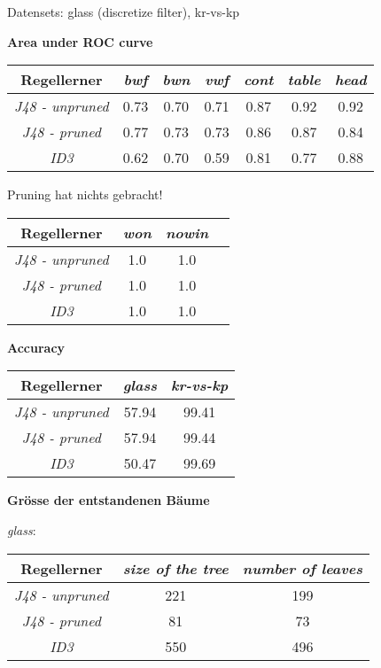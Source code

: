 
Datensets: glass (discretize filter), kr-vs-kp

\textbf{Area under ROC curve}

\begin{tabular}{c|c|c|c|c|c|c}
				Regellerner       & \emph{bwf} & \emph{bwn} & \emph{vwf}  & \emph{cont} & \emph{table} & \emph{head} \\ \hline
				\emph{J48 - unpruned}& 0.73 & 0.70 & 0.71 & 0.87 & 0.92 & 0.92 \\ \hline
				\emph{J48 - pruned}  & 0.77 & 0.73 & 0.73 & 0.86 & 0.87 & 0.84 \\ \hline
				\emph{ID3}           & 0.62 & 0.70 & 0.59 & 0.81 & 0.77 & 0.88 \\ \hline
\end{tabular}

Pruning hat nichts gebracht!

\begin{tabular}{c|c|c|c}
				Regellerner       & \emph{won} & \emph{nowin} \\ \hline
				\emph{J48 - unpruned} & 1.0 & 1.0  \\ \hline
				\emph{J48 - pruned}  & 1.0 & 1.0  \\ \hline
				\emph{ID3}  & 1.0 & 1.0 \\ \hline
\end{tabular}


\textbf{Accuracy}

\begin{tabular}{c|c|c}
				Regellerner       & \emph{glass} & \emph{kr-vs-kp}  \\ \hline
				\emph{J48 - unpruned}  & 57.94 & 99.41 \\ \hline
				\emph{J48 - pruned} & 57.94  & 99.44 \\ \hline
				\emph{ID3}  & 50.47 & 99.69\\ \hline
\end{tabular}

\textbf{Gr\"osse der entstandenen B\"aume}

\emph{glass}:
\begin{tabular}{c|c|c}
	Regellerner       & \emph{size of the tree} & \emph{number of leaves}  \\ \hline
	\emph{J48 - unpruned} & 221  & 199  \\ \hline
	\emph{J48 - pruned}   & 81   & 73   \\ \hline
	\emph{ID3}            & 550  & 496  \\ \hline
\end{tabular}


